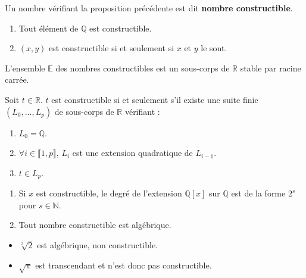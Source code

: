  \begin{definition}
    Un nombre vérifiant la proposition précédente est dit \textbf{nombre constructible}.
  \end{definition}

  \begin{proposition}
    \begin{enumerate}[label={\bfseries(\roman*)}]
      \item Tout élément de $\mathbb{Q}$ est constructible.
      \item $(x,y)$ est constructible si et seulement si $x$ et $y$ le sont.
    \end{enumerate}
  \end{proposition}

  \begin{theorem}
    L'ensemble $\mathbb{E}$ des nombres constructibles est un sous-corps de $\mathbb{R}$ stable par racine carrée.
  \end{theorem}


  \begin{theorem}
    Soit $t \in \mathbb{R}$. $t$ est constructible si et seulement s'il existe une suite finie $(L_0, \dots, L_p)$ de sous-corps de $\mathbb{R}$ vérifiant :
    \begin{enumerate}[label={\bfseries(\roman*)}]
      \item $L_0 = \mathbb{Q}$.
      \item $\forall i \in \llbracket 1, p \rrbracket$, $L_i$ est une extension quadratique de $L_{i-1}$.
      \item $t \in L_p$.
    \end{enumerate}
  \end{theorem}

  \begin{corollary}
    \begin{enumerate}[label={\bfseries(\roman*)}]
      \item Si $x$ est constructible, le degré de l'extension $\mathbb{Q}[x]$ sur $\mathbb{Q}$ est de la forme $2^s$ pour $s \in \mathbb{N}$.
      \item Tout nombre constructible est algébrique.
    \end{enumerate}
  \end{corollary}

  \begin{cexample}
    \begin{itemize}
      \item $\sqrt[3]{2}$ est algébrique, non constructible.
      \item $\sqrt{\pi}$ est transcendant et n'est donc pas constructible.
    \end{itemize}
  \end{cexample}

